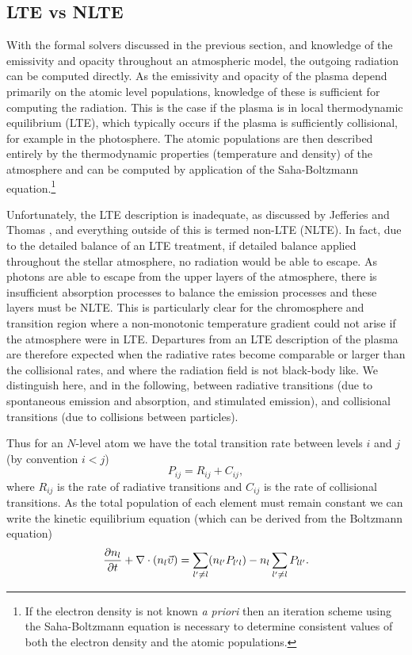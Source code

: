 \subsection{LTE vs NLTE}


With the formal solvers discussed in the previous section, and knowledge of the emissivity and opacity throughout an atmospheric model, the outgoing radiation can be computed directly. As the emissivity and opacity of the plasma depend primarily on the atomic level populations, knowledge of these is sufficient for computing the radiation.
This is the case if the plasma is in local thermodynamic equilibrium (LTE), which typically occurs if the plasma is sufficiently collisional, for example in the photosphere. The atomic populations are then described entirely by the thermodynamic properties (temperature and density) of the atmosphere and can be computed by application of the Saha-Boltzmann equation.\footnote{If the electron density is not known \textit{a priori} then an iteration scheme using the Saha-Boltzmann equation is necessary to determine consistent values of both the electron density and the atomic populations.}

Unfortunately, the LTE description is inadequate, as discussed by Jefferies and Thomas \NeedRef{}, and everything outside of this is termed non-LTE (NLTE). In fact, due to the detailed balance of an LTE treatment, if detailed balance applied throughout the stellar atmosphere, no radiation would be able to escape. As photons are able to escape from the upper layers of the atmosphere, there is insufficient absorption processes to balance the emission processes and these layers must be NLTE. This is particularly clear for the chromosphere and transition region where a non-monotonic temperature gradient could not arise if the atmosphere were in LTE.
Departures from an LTE description of the plasma are therefore expected when the radiative rates become comparable or larger than the collisional rates, and where the radiation field is not black-body like.
We distinguish here, and in the following, between radiative transitions (due to spontaneous emission and absorption, and stimulated emission), and collisional transitions (due to collisions between particles).

Thus for an $N$-level atom we have the total transition rate between levels $i$ and $j$ (by convention $i < j$)
\begin{equation}
    P_{ij} = R_{ij} + C_{ij},
\end{equation}
where $R_{ij}$ is the rate of radiative transitions and $C_{ij}$ is the rate of collisional transitions.
As the total population of each element must remain constant we can write the kinetic equilibrium equation (which can be derived from the Boltzmann equation)
\begin{equation}
    \frac{\partial n_l}{\partial t} + \nabla \cdot (n_l \vec{\upsilon}) = \sum_{l^\prime\neq l} (n_{l^\prime} P_{l^\prime l}) - n_l \sum_{l^\prime\neq l} P_{ll^\prime}.
    \label{Eq:KinEq}
\end{equation}

